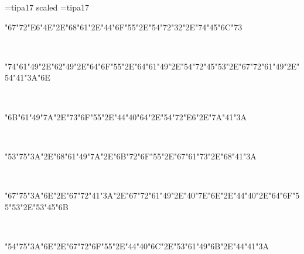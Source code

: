 \font\ipa=tipa17 scaled  \font\acc=tipa17
\def\tl#1{{\acc\accent"00 #1}}
\def\tm#1{{\acc\accent"09 #1}}
\def\u#1{{\acc\accent"08 #1}}
\def\th#1{{\acc\accent"01 #1}}
\def\thh#1{{\acc\accent"05 #1}}
\def\tll#1{{\acc\accent"0D #1}}
\null\vfill
\centerline{\ipa\char"67\ipa\char"72\ipa\char"E6\ipa\char"4E\ipa\char"2E\ipa\char"68\ipa\char"61\ipa\char"2E\ipa\char"44\ipa\char"6F\ipa\char"55\ipa\char"2E\ipa\char"54\ipa\char"72\ipa\char"32\ipa\char"2E\ipa\char"74\ipa\char"45\ipa\char"6C\ipa\char"73}\

\centerline{\ipa\char"74\ipa\char"61\ipa\char"49\ipa\char"2E\ipa\char"62\ipa\char"49\ipa\char"2E\ipa\char"64\ipa\char"6F\ipa\char"55\ipa\char"2E\ipa\char"64\ipa\char"61\ipa\char"49\ipa\char"2E\ipa\char"54\ipa\char"72\ipa\char"45\ipa\char"53\ipa\char"2E\ipa\char"67\ipa\char"72\ipa\char"61\ipa\char"49\ipa\char"2E\ipa\char"54\ipa\char"41\ipa\char"3A\ipa\char"6E}\

\centerline{\ipa\char"6B\ipa\char"61\ipa\char"49\ipa\char"7A\ipa\char"2E\ipa\char"73\ipa\char"6F\ipa\char"55\ipa\char"2E\ipa\char"44\ipa\char"40\ipa\char"64\ipa\char"2E\ipa\char"54\ipa\char"72\ipa\char"E6\ipa\char"2E\ipa\char"7A\ipa\char"41\ipa\char"3A}\

\centerline{}

\centerline{\ipa\char"53\ipa\char"75\ipa\char"3A\ipa\char"2E\ipa\char"68\ipa\char"61\ipa\char"49\ipa\char"7A\ipa\char"2E\ipa\char"6B\ipa\char"72\ipa\char"6F\ipa\char"55\ipa\char"2E\ipa\char"67\ipa\char"61\ipa\char"73\ipa\char"2E\ipa\char"68\ipa\char"41\ipa\char"3A}\

\centerline{\ipa\char"67\ipa\char"75\ipa\char"3A\ipa\char"6E\ipa\char"2E\ipa\char"67\ipa\char"72\ipa\char"41\ipa\char"3A\ipa\char"2E\ipa\char"67\ipa\char"72\ipa\char"61\ipa\char"49\ipa\char"2E\ipa\char"40\ipa\char"7E\ipa\char"6E\ipa\char"2E\ipa\char"44\ipa\char"40\ipa\char"2E\ipa\char"64\ipa\char"6F\ipa\char"55\ipa\char"53\ipa\char"2E\ipa\char"53\ipa\char"45\ipa\char"6B}\

\centerline{\ipa\char"54\ipa\char"75\ipa\char"3A\ipa\char"6E\ipa\char"2E\ipa\char"67\ipa\char"72\ipa\char"6F\ipa\char"55\ipa\char"2E\ipa\char"44\ipa\char"40\ipa\char"6C\ipa\char"2E\ipa\char"53\ipa\char"61\ipa\char"49\ipa\char"6B\ipa\char"2E\ipa\char"44\ipa\char"41\ipa\char"3A}\bye